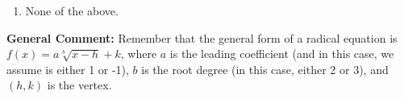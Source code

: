 \documentclass{extbook}[14pt]
\begin{document}
\begin{enumerate}
{\begin{enumerate}[label=\Alph*.]
\item None of the above.\end{enumerate}
\textbf{General Comment:} Remember that the general form of a radical equation is $ f(x) = a \sqrt[b]{x - h} + k $, where $a$ is the leading coefficient (and in this case, we assume is either 1 or -1), $b$ is the root degree (in this case, either 2 or 3), and $(h, k)$ is the vertex.
}
\end{enumerate}
\end{document}
